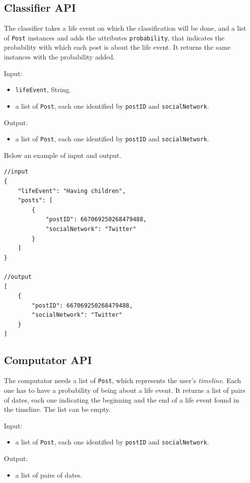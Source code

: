 \subsection{Classifier API}
The classifier takes a life event on which the classification will be done, and a list of \texttt{Post} instances and adds the attributes \texttt{probability}, that indicates the probability with which each post is about the life event. It returns the same instances with the probability added.

Input:
\begin{itemize}
\item \texttt{lifeEvent}, String.
\item a list of \texttt{Post}, each one identified by \texttt{postID} and \texttt{socialNetwork}.
\end{itemize}

Output:
\begin{itemize}
\item a list of \texttt{Post}, each one identified by \texttt{postID} and \texttt{socialNetwork}.
\end{itemize}

Below an example of input and output.

\begin{Verbatim}
//input
{
	"lifeEvent": "Having children",
	"posts": [
		{
			"postID": 667069250268479488,
			"socialNetwork": "Twitter"
		}
	]
}

//output
[
	{
		"postID": 667069250268479488,
		"socialNetwork": "Twitter"
	}
]
\end{Verbatim}

\subsection{Computator API}
The computator needs a list of \texttt{Post}, which represents the user's \textit{timeline}. Each one has to have a probability of being about a life event. It returns a list of pairs of dates, each one indicating the beginning and the end of a life event found in the timeline. The list can be empty.

Input:
\begin{itemize}
\item a list of \texttt{Post}, each one identified by \texttt{postID} and \texttt{socialNetwork}.
\end{itemize}

Output:
\begin{itemize}
\item a list of pairs of dates.
\end{itemize}

